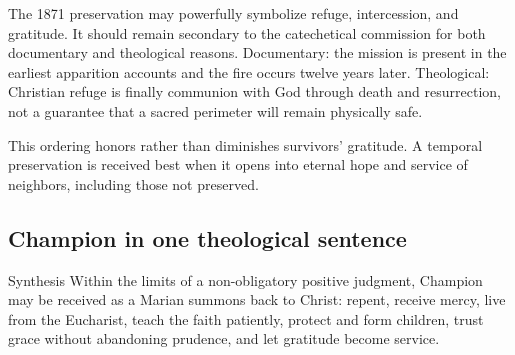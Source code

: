The 1871 preservation may powerfully symbolize refuge, intercession, and gratitude. It should remain secondary to the catechetical commission for both documentary and theological reasons. Documentary: the mission is present in the earliest apparition accounts and the fire occurs twelve years later. Theological: Christian refuge is finally communion with God through death and resurrection, not a guarantee that a sacred perimeter will remain physically safe.

This ordering honors rather than diminishes survivors' gratitude. A temporal preservation is received best when it opens into eternal hope and service of neighbors, including those not preserved.

\subsection{Champion in one theological sentence}

\begin{studybox}{Synthesis}
Within the limits of a non-obligatory positive judgment, Champion may be received as a Marian summons back to Christ: repent, receive mercy, live from the Eucharist, teach the faith patiently, protect and form children, trust grace without abandoning prudence, and let gratitude become service.
\end{studybox}
